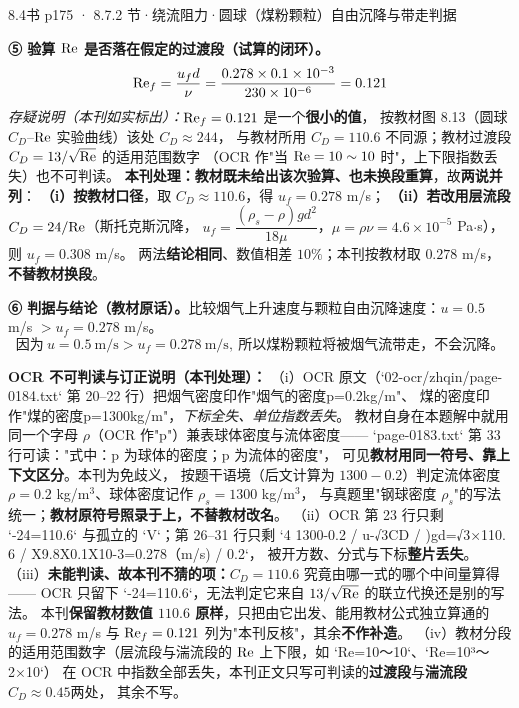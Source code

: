 \begin{liti}{8.4}{书 p175 · 8.7.2 节·绕流阻力·圆球（煤粉颗粒）自由沉降与带走判据}
\begin{jie}
\textbf{⑤ 验算 $\mathrm{Re}$ 是否落在假定的过渡段（试算的闭环）。}
\[ \mathrm{Re}_f=\frac{u_fd}{\nu}=\frac{0.278\times0.1\times10^{-3}}{230\times10^{-6}}=0.121 \]
\emph{存疑说明（本刊如实标出）：}$\mathrm{Re}_f=0.121$ 是一个\textbf{很小的值}，
按教材图 8.13（圆球 $C_D$--$\mathrm{Re}$ 实验曲线）该处 $C_D\approx244$，
与教材所用 $C_D=110.6$ 不同源；教材过渡段 $C_D=13/\sqrt{\mathrm{Re}}$ 的适用范围数字
（OCR 作"当 $\mathrm{Re}=10\sim10$ 时"，上下限指数丢失）也不可判读。
\textbf{本刊处理：教材既未给出该次验算、也未换段重算}，故\textbf{两说并列}：
\textbf{（i）按教材口径}，取 $C_D\approx110.6$，得 $u_f=0.278$ m/s；
\textbf{（ii）若改用层流段} $C_D=24/\mathrm{Re}$（斯托克斯沉降，
$u_f=\dfrac{(\rho_s-\rho)gd^2}{18\mu}$，$\mu=\rho\nu=4.6\times10^{-5}$ Pa$\cdot$s），
则 $u_f=0.308$ m/s。
两法\textbf{结论相同}、数值相差 $10\%$；本刊按教材取 $0.278$ m/s，\textbf{不替教材换段}。

\textbf{⑥ 判据与结论（教材原话）。}比较烟气上升速度与颗粒自由沉降速度：$u=0.5$ m/s $>u_f=0.278$ m/s。
\[ \text{因为}\ u=0.5\ \mathrm{m/s}>u_f=0.278\ \mathrm{m/s},\
   \text{所以煤粉颗粒将被烟气流带走，不会沉降。} \]
\end{jie}

\begin{tishi}
\textbf{OCR 不可判读与订正说明（本刊处理）：}
（i）OCR 原文（`02-ocr/zhqin/page-0184.txt` 第 20--22 行）把烟气密度印作"烟气的密度p=0.2kg/m"、
煤的密度印作"煤的密度p=1300kg/m"，\emph{下标全失、单位指数丢失}。
教材自身在本题解中就用同一个字母 $\rho$（OCR 作"p"）兼表球体密度与流体密度——
`page-0183.txt` 第 33 行可读："式中：p 为球体的密度；p 为流体的密度"，
可见\textbf{教材用同一符号、靠上下文区分}。本刊为免歧义，
按题干语境（后文计算为 $1300-0.2$）判定流体密度 $\rho=0.2$ kg/m$^3$、球体密度记作 $\rho_s=1300$ kg/m$^3$，
与真题里"钢球密度 $\rho_s$"的写法统一；\textbf{教材原符号照录于上，不替教材改名}。
（ii）OCR 第 23 行只剩 `-24=110.6` 与孤立的 `V`；第 26--31 行只剩
`4 1300-0.2 / u-√3CD / )gd=√3×110. 6 / X9.8X0.1X10-3=0.278（m/s) / 0.2`，
被开方数、分式与下标\textbf{整片丢失}。
（iii）\textbf{未能判读、故本刊不猜的项：}$C_D=110.6$ 究竟由哪一式的哪个中间量算得——
OCR 只留下 `-24=110.6`，无法判定它来自 $13/\sqrt{\mathrm{Re}}$ 的联立代换还是别的写法。
本刊\textbf{保留教材数值 $110.6$ 原样}，只把由它出发、能用教材公式独立算通的 $u_f=0.278$ m/s
与 $\mathrm{Re}_f=0.121$ 列为"本刊反核"，其余\textbf{不作补造}。
（iv）教材分段的适用范围数字（层流段与湍流段的 $\mathrm{Re}$ 上下限，如 `Re=10～10`、`Re=10³～2×10`）
在 OCR 中指数全部丢失，本刊正文只写可判读的\textbf{过渡段}与\textbf{湍流段 $C_D\approx0.45$}两处，
其余不写。
\end{tishi}
\end{liti}

